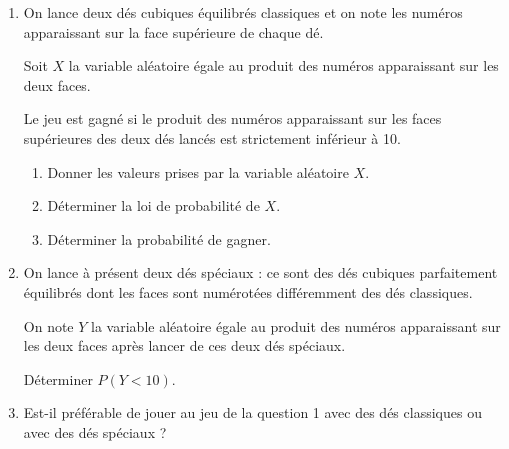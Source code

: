 \bigskip

\begin{enumerate}
\item On lance deux dés cubiques équilibrés \og classiques \fg{} et on note les numéros apparaissant sur la face supérieure de chaque dé.

Soit $X$ la variable aléatoire égale au produit des numéros apparaissant sur les deux faces.

Le jeu est gagné si le produit des numéros apparaissant sur les faces supérieures des deux
dés lancés est strictement inférieur à 10.

\medskip

\begin{enumerate}
\item Donner les valeurs prises par la variable aléatoire $X$.
\item Déterminer la loi de probabilité de  $X$.
\item Déterminer la probabilité de gagner.
\end{enumerate}

\item On lance à présent deux dés spéciaux : ce sont des dés cubiques parfaitement équilibrés dont les faces sont numérotées différemment des dés classiques.


On note $Y$ la variable aléatoire égale au produit des numéros apparaissant sur les deux faces après lancer de ces deux dés spéciaux.

Déterminer $P(Y < 10)$.

\item Est-il préférable de jouer au jeu de la question 1 avec des dés classiques ou avec des dés
spéciaux ?
\end{enumerate}

\vspace{0.5cm}
